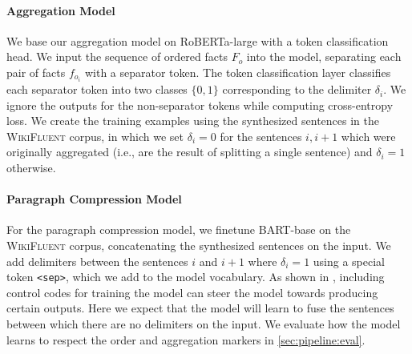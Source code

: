 



\paragraph{Aggregation Model}
We base our aggregation model on RoBERTa-large \cite{liuRoBERTaRobustlyOptimized2019} with a token classification head. We input the sequence of ordered facts $F_o$ into the model, separating each pair of facts $f_{o_i}$ with a separator token. The token classification layer classifies each separator token into two classes $\{0,1\}$ corresponding to the delimiter $\delta_i$. We ignore the outputs for the non-separator tokens while computing cross-entropy loss. We create the training examples using the synthesized sentences in the \textsc{WikiFluent} corpus, in which we set $\delta_i=0$ for the sentences $i,i+1$ which were originally aggregated (i.e., are the result of splitting a single sentence) and $\delta_i=1$ otherwise.

\paragraph{Paragraph Compression Model} For the paragraph compression model, we finetune BART-base \cite{lewisBARTDenoisingSequencetoSequence2019} on the \textsc{WikiFluent} corpus, concatenating the synthesized sentences on the input. We add delimiters between the sentences $i$ and $i+1$ where $\delta_i=1$ using a special token \texttt{<sep>}, which we add to the model vocabulary. As shown in \citet{keskar2019ctrl}, including control codes for training the model can steer the model towards producing certain outputs. Here we expect that the model will learn to fuse the sentences between which there are no delimiters on the input. We evaluate how the model learns to respect the order and aggregation markers in \autoref{sec:pipeline:eval}.


